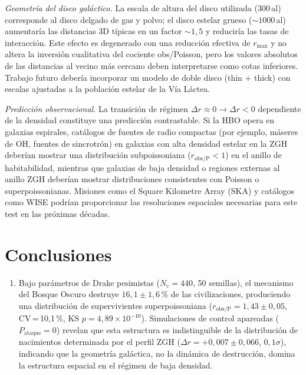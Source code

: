 \documentclass[11pt,a4paper,onecolumn]{article}
\begin{document}
\begin{table}[h]
\textit{Geometría del disco galáctico.}
La escala de altura del disco utilizada (300\,al) corresponde al disco
delgado de gas y polvo; el disco estelar grueso ($\sim 1000$\,al)
aumentaría las distancias 3D típicas en un factor $\sim 1{,}5$ y
reduciría las tasas de interacción.
Este efecto es degenerado con una reducción efectiva de $r_\text{max}$
y no altera la inversión cualitativa del cociente obs/Poisson, pero
los valores absolutos de las distancias al vecino más cercano deben
interpretarse como cotas inferiores.
Trabajo futuro debería incorporar un modelo de doble disco (thin + thick)
con escalas ajustadas a la población estelar de la Vía Láctea.

\textit{Predicción observacional.}
La transición de régimen $\Delta r \approx 0 \to \Delta r < 0$ dependiente
de la densidad constituye una predicción contrastable.
Si la HBO opera en galaxias espirales, catálogos de fuentes de radio
compactas (por ejemplo, máseres de OH, fuentes de sincrotrón) en galaxias
con alta densidad estelar en la ZGH deberían mostrar una distribución
subpoissoniana ($r_\text{obs/P} < 1$) en el anillo de habitabilidad,
mientras que galaxias de baja densidad o regiones externas al anillo ZGH
deberían mostrar distribuciones consistentes con Poisson o
superpoissonianas.
Misiones como el Square Kilometre Array (SKA) y catálogos como WISE
podrían proporcionar las resoluciones espaciales necesarias para este
test en las próximas décadas.

\section{Conclusiones}
\label{sec:conclusions}

\begin{enumerate}
  \item Bajo parámetros de Drake pesimistas ($N_c = 440$, 50 semillas),
        el mecanismo del Bosque Oscuro destruye $16{,}1 \pm 1{,}6$\,\%
        de las civilizaciones, produciendo una distribución de
        supervivientes superpoissoniana
        ($r_\text{obs/P} = 1{,}43 \pm 0{,}05$, CV\,=\,10{,}1\,\%,
        KS $p = 4{,}89\times10^{-10}$).
        Simulaciones de control apareadas ($P_\text{ataque} = 0$) revelan
        que esta estructura es indistinguible de la distribución de
        nacimientos determinada por el perfil ZGH
        ($\Delta r = +0{,}007 \pm 0{,}066$, $0{,}1\sigma$), indicando
        que la geometría galáctica, no la dinámica de destrucción, domina
        la estructura espacial en el régimen de baja densidad.


\end{enumerate}
\end{table}
\end{document}
